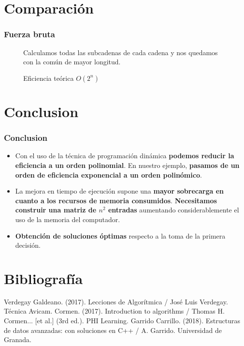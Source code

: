 \documentclass[13pt]{beamer}
\begin{document}
	\section{Comparación}
	
	\begin{frame}
		\frametitle{Fuerza bruta}
		\begin{figure}
			Calculamos todas las subcadenas de cada cadena y nos quedamos con la
			común de mayor longitud.
			
			\begin{block}{Eficiencia teórica}
				\centering
				$O(2^{n})$
			\end{block}
			
		\end{figure}
	\end{frame}
	
	\section{Conclusion}

    \begin{frame}
		\frametitle{Conclusion}
        \begin{itemize}
            
            \item Con el uso de la técnica de programación dinámica \textbf{podemos reducir la eficiencia a un orden polinomial}. En nuestro ejemplo, \textbf{pasamos de un orden de eficiencia exponencial
            a un orden polinómico}.
            
            \item La mejora en tiempo de ejecución supone una \textbf{mayor sobrecarga en cuanto a los recursos de memoria consumidos}.  \textbf{Necesitamos construir una matriz de $n^{2}$ 
            entradas} aumentando considerablemente el uso de la memoria del computador.

            \item \textbf{Obtención de soluciones óptimas} respecto a la toma de la primera decisión.
            
            
        \end{itemize}
	\end{frame}


    \section{Bibliografía}

    \begin{frame}
        \begin{thebibliography}{0}
             Verdegay Galdeano. (2017). Lecciones de Algorítmica / José Luis Verdegay. Técnica Avicam.
             Cormen. (2017). Introduction to algorithms / Thomas H. Cormen... [et al.] (3rd ed.). PHI Learning.
             Garrido Carrillo. (2018). Estructuras de datos avanzadas: con soluciones en C++ / A. Garrido. Universidad de Granada.  
        \end{thebibliography}
    \end{frame}
\end{document}
